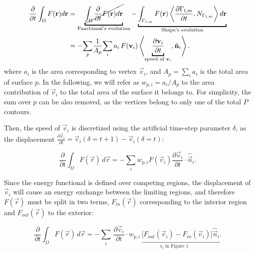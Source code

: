 {  \begin{align}
  \frac{\partial}{\partial t} \int_\Omega F(\vec{r}) d\vec{r} &=
  \underbracket{\cancel{\int_\Omega \frac{\partial}{\partial t}F(\vec{r}) d\vec{r} }}_{\text{Functional's evolution}}
  - \underbracket{\int_{\Gamma_{l,m}} F(\vec{r}) \left\langle \frac{\partial \Gamma_{l,m}}{\partial t},
  N_{\Gamma_{l,m}}\right\rangle d\vec{r}}_{\text{Shape's evolution}} \notag \\
  & = - \underset{p}{\sum} \frac{1}{A_p} \underset{i}{\sum} \, a_i \, F(\vec{v}_i) \left\langle \underbracket{\frac{\partial \vec{v}_i}{\partial t}}_{\text{speed of }\vec{v}_i},
  \hat{\vec{n}}_{i}\right\rangle.
  \label{eq:regseg-shape_gradient_orig}
  \end{align}
where $a_i$ is the area corresponding to vertex $\vec{v}_i$, and $A_p = \sum_i a_i$ is the total area of surface $p$.
In the following, we will refer as $w_{p,i} = a_i / A_p $ to the area contribution of $\vec{v}_i$ to the
  total area of the surface it belongs to.
For simplicity, the sum over $p$ can be also removed, as the vertices belong to only one of the total $P$ contours.

Then, the speed of $\vec{v}_i$ is discretized using the artificial time-step parameter $\delta$, as the displacement
  $\frac{\partial \vec{v}_i}{\partial t} = \vec{v}_i(\delta = t+1) - \vec{v}_i(\delta = t)$:

  \begin{equation}
  \frac{\partial}{\partial t} \int_\Omega F(\vec{r}) \, d\vec{r} =
  - \underset{i}{\sum} w_{p,i} F(\vec{v}_i) \frac{\partial \vec{v}_i}{\partial t} \cdot \hat{\vec{n}}_i.
  \label{eq:regseg-shape_gradient_disc1}
  \end{equation}

Since the energy functional is defined over competing regions, the displacement of $\vec{v}_i$ will cause
  an energy exchange between the limiting regions, and therefore $F(\vec{r})$ must be split in
  two terms, $F_{in}(\vec{r})$ corresponding to the interior region and $F_{out}(\vec{r})$ to the exterior:

  \begin{equation}
  \frac{\partial}{\partial t} \int_\Omega F(\vec{r}) \, d\vec{r} =
  - \underset{i}{\sum} \, \frac{\partial \vec{v}_i}{\partial t} \cdot
  \underbracket{w_{p,i} \, \Big[ F_{out}(\vec{v}_i) - F_{in}(\vec{v}_i) \Big] \hat{\vec{n}}_i}_{\bar{s}_i \text{ in Figure 1}}.
  \label{eq:regseg-shape_gradient_disc2}
  \end{equation}}

